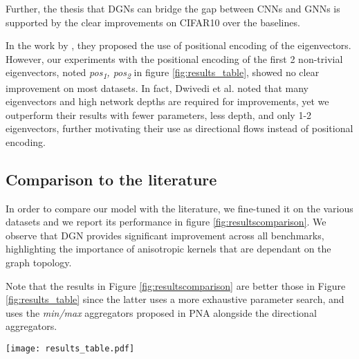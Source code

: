 \documentclass{article} \usepackage{arxiv,times}
\begin{document}
Further, the thesis that DGNs can bridge the gap between CNNs and GNNs is supported by the clear improvements on CIFAR10 over the baselines. 

In the work by \cite{dwivedi2020benchmarking}, they proposed the use of positional encoding of the eigenvectors. However, our experiments with the positional encoding of the first 2 non-trivial eigenvectors, noted \textit{pos\textsubscript{1}, pos\textsubscript{2}} in figure \ref{fig:results_table}, showed no clear improvement on most datasets. In fact, Dwivedi et al. noted that many eigenvectors and high network depths are required for improvements, yet we outperform their results with fewer parameters, less depth, and only 1-2 eigenvectors, further motivating their use as directional flows instead of positional encoding.




\subsection{Comparison to the literature}

In order to compare our model with the literature, we fine-tuned it on the various datasets and we report its performance in figure \ref{fig:resultscomparison}. We observe that DGN provides significant improvement across all benchmarks, highlighting the importance of anisotropic kernels that are dependant on the graph topology.

Note that the results in Figure \ref{fig:resultscomparison} are better those in Figure \ref{fig:results_table} since the latter uses a more exhaustive parameter search, and uses the \textit{min/max} aggregators proposed in PNA \cite{corso2020principal} alongside the directional aggregators.


\begin{figure*}[ht]
\centering
\texttt{[image: results\_table.pdf]}
\vspace{-8pt}
\caption{Test set results using a parameter budget of  with the same hyperparameters as \cite{corso2020principal}, except MolPCBA with a budget of . The low-frequency Laplacian eigenvectors are used to define the directions, except for CIFAR10 that uses the coordinates of the image. For brevity, we denote \textit{dx}\textsubscript{i} and \textit{av}\textsubscript{i} as the directional derivative  and smoothing  aggregators of the -th direction. We also denote \textit{pos}\textsubscript{i} as the -th eigenvector used as positional encoding for the mean aggregator.}
\label{fig:results_table}
\end{figure*}
\end{document}
